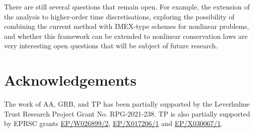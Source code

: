\documentclass[final,12pt]{amsart}
\theoremstyle{plain}
\theoremstyle{definition}
\begin{document}
There are still several questions that remain open.  For example, the extension of the analysis
to higher-order time discretisations,   exploring the possibility of combining the
current method with IMEX-type schemes for nonlinear problems, and whether this framework
can be extended to nonlinear conservation laws are very interesting open
questions that will be subject of future research.

\section*{Acknowledgements}
The work of AA, GRB, and TP has been partially supported by the
Leverhulme Trust Research Project Grant No. RPG-2021-238.  TP is also
partially supported by EPRSC grants
\href{https://gow.epsrc.ukri.org/NGBOViewGrant.aspx?GrantRef=EP/W026899/2}
{EP/W026899/2},
\href{https://gow.epsrc.ukri.org/NGBOViewGrant.aspx?GrantRef=EP/X017206/1}
{EP/X017206/1}
and
\href{https://gow.epsrc.ukri.org/NGBOViewGrant.aspx?GrantRef=EP/X030067/1}
{EP/X030067/1}. 




	
\end{document}
